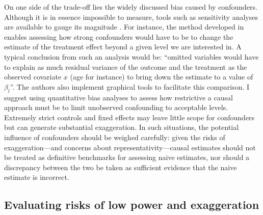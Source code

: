\documentclass[usletter, 12pt]{article}
\begin{document}
			On one side of the trade-off lies the widely discussed bias caused by confounders. Although it is in essence impossible to measure, tools such as sensitivity analyses are available to gauge its magnitude \citep{rosenbaum_observational_2002, middleton_bias_2016, oster_unobservable_2019, cinelli_making_2020}. For instance, the method developed in \cite{cinelli_making_2020} enables assessing how strong confounders would have to be to change the estimate of the treatment effect beyond a given level we are interested in. %
			A typical conclusion from such an analysis would be: ``omitted variables would have to explain as much residual variance of the outcome and the treatment as the observed covariate $x$ (age for instance) to bring down the estimate to a value of $\beta_{l}$''. The authors also implement graphical tools to facilitate this comparison. I suggest using quantitative bias analyses to assess how restrictive a causal approach must be to limit unobserved confounding to acceptable levels. Extremely strict controls and fixed effects may leave little scope for confounders but can generate substantial exaggeration. In such situations, the potential influence of confounders should be weighed carefully: given the risks of exaggeration---and concerns about representativity---causal estimates should not be treated as definitive benchmarks for assessing naive estimates, nor should a discrepancy between the two be taken as sufficient evidence that the naive estimate is incorrect.
			
		\subsection{Evaluating risks of low power and exaggeration}
\end{document}
